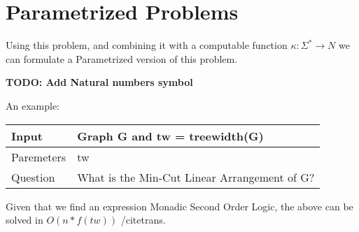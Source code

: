 \section{Parametrized Problems}

Using this problem, and combining it with a computable function $ \kappa : \Sigma^* \rightarrow N $ we can formulate a Parametrized version of this problem. 

\textbf{TODO: Add Natural numbers symbol}

An example:

\begin{center}
    \begin{tabular}{| l | p{5cm} |}
    \hline
    Input & Graph G and tw = treewidth(G)\\ \hline
    Paremeters & tw  \\ \hline
    Question & What is the Min-Cut Linear Arrangement of G?\\ \hline
    \end{tabular}
\end{center}

Given that we find an expression Monadic Second Order Logic, the above can be solved in $O(n*f(tw))$ /cite{trans}. 


